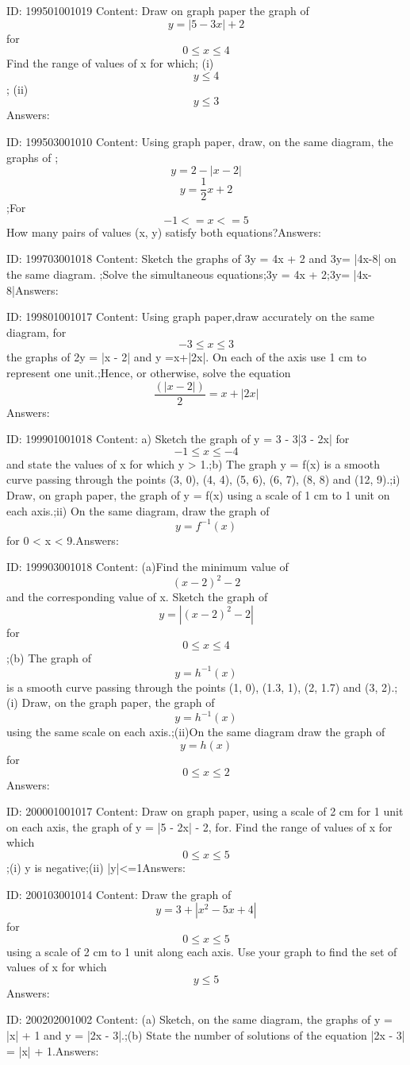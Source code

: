 \documentclass{article}
\begin{document}
ID: 199501001019
Content:
Draw on graph paper the graph of \[y=\left | 5-3x \right |+2\]  for \[0\leqslant x\leqslant 4\] Find the range of values of x for which;
(i)	\[y\leqslant 4\];
(ii)\[y\leqslant 3\]Answers:

ID: 199503001010
Content:
Using graph paper, draw, on the same diagram, the graphs of ;     \[y=2-|x-2|\] \[y=\frac{1}{2}x+2\];For \[-1<=x<=5\] How many pairs of values (x, y) satisfy both equations?Answers:

ID: 199703001018
Content:
Sketch the graphs of 3y = 4x + 2 and 3y= |4x-8| on the same diagram. ;Solve the simultaneous equations;3y = 4x + 2;3y= |4x-8|Answers:

ID: 199801001017
Content:
Using graph paper,draw accurately on the same diagram, for \[-3\leq x\leq 3\] the graphs of 2y = |x - 2| and y =x+|2x|. On each of the axis use 1 cm to represent one unit.;Hence, or otherwise, solve the equation\[\frac{(|x-2|)}{2}=x+|2x|\]Answers:

ID: 199901001018
Content:
a) Sketch the graph of y = 3 - 3|3 - 2x| for \[-1\leq x\leq -4\] and state the values of x for which y > 1.;b) The graph y = f(x) is a smooth curve passing through the points (3, 0), (4, 4), (5, 6), (6, 7), (8, 8) and (12, 9).;i) Draw, on graph paper, the graph of y = f(x) using a scale of 1 cm to 1 unit on each axis.;ii) On the same diagram, draw the graph of $$y =f^{-1}(x)$$ for 0 < x < 9.Answers:

ID: 199903001018
Content:
(a)Find the minimum value of \[(x-2)^2-2\] and the corresponding value of x. Sketch the graph of \[y=|(x-2)^2-2|\] for \[0\leq x\leq 4\];(b) The graph of \[y=h^{-1}(x)\] is a smooth curve passing through the points (1, 0), (1.3, 1), (2, 1.7) and (3, 2).;(i)	Draw, on the graph paper, the graph of \[y=h^{-1}(x)\]using the same scale on each axis.;(ii)On the same diagram draw the graph of \[y=h(x)\]for \[0\leq x\leq 2\]Answers:

ID: 200001001017
Content:
Draw on graph paper, using a scale of 2 cm for 1 unit on each axis, the graph of y = |5 - 2x| - 2, for. Find the range of values of x for which \[0\leq x\leq 5\] ;(i) y is negative;(ii) |y|<=1Answers:

ID: 200103001014
Content:
Draw the graph of \[y=3+|x^2-5x+4|\] for \[0\leq x\leq 5\] using a scale of 2 cm to 1 unit along each axis. Use your graph to find the set of values of x for which \[y\leq 5\]Answers:

ID: 200202001002
Content:
(a)	Sketch, on the same diagram, the graphs of y = |x| + 1 and y = |2x - 3|.;(b)	State the number of solutions of the equation |2x - 3| = |x| + 1.Answers:
\end{document}
